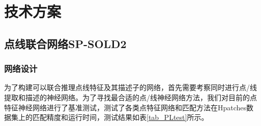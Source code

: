 
\chapter{技术方案}
\section{点线联合网络SP-SOLD2}
\subsection{网络设计}
为了构建可以联合推理点线特征及其描述子的网络，首先需要考察同时进行点/线提取和描述的神经网络。为了寻找最合适的点/线神经网络方法，我们对目前的点特征神经网络进行了基准测试，测试了各类点特征网络和匹配方法在Hpatches数据集上的匹配精度和运行时间，测试结果如表\ref{tab_PLtest}所示。
